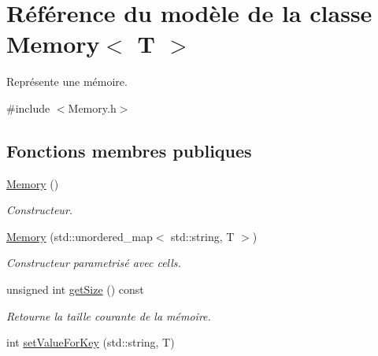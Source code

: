 \hypertarget{classMemory}{\section{Référence du modèle de la classe Memory$<$ T $>$}
\label{classMemory}
}


Représente une mémoire.  




{\ttfamily \#include $<$Memory.\-h$>$}

\subsection*{Fonctions membres publiques}
\begin{DoxyCompactItemize}
\item 
\hypertarget{classMemory_aa546b7c6e170e45a4e4f74492d8fe8bf}{\hyperlink{classMemory_aa546b7c6e170e45a4e4f74492d8fe8bf}{Memory} ()}\label{classMemory_aa546b7c6e170e45a4e4f74492d8fe8bf}

\begin{DoxyCompactList}\small\item\em Constructeur. \end{DoxyCompactList}\item 
\hypertarget{classMemory_af1e6452dbe3bb1650604140814710b95}{\hyperlink{classMemory_af1e6452dbe3bb1650604140814710b95}{Memory} (std\-::unordered\-\_\-map$<$ std\-::string, T $>$)}\label{classMemory_af1e6452dbe3bb1650604140814710b95}

\begin{DoxyCompactList}\small\item\em Constructeur parametrisé avec cells. \end{DoxyCompactList}\item 
\hypertarget{classMemory_a6b5355fcde424ee8e53dbf03df995b1d}{unsigned int \hyperlink{classMemory_a6b5355fcde424ee8e53dbf03df995b1d}{get\-Size} () const }\label{classMemory_a6b5355fcde424ee8e53dbf03df995b1d}

\begin{DoxyCompactList}\small\item\em Retourne la taille courante de la mémoire. \end{DoxyCompactList}\item 
\hypertarget{classMemory_a3514e7594615bb1748ba5b57259c9eca}{int \hyperlink{classMemory_a3514e7594615bb1748ba5b57259c9eca}{set\-Value\-For\-Key} (std\-::string, T)}\label{classMemory_a3514e7594615bb1748ba5b57259c9eca}


\end{DoxyCompactItemize}
